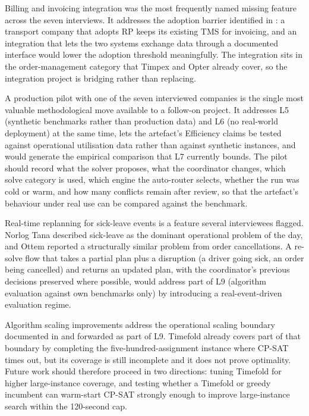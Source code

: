 Billing and invoicing integration was the most frequently named missing feature across the seven interviews. It addresses the adoption barrier identified in : a transport company that adopts RP keeps its existing TMS for invoicing, and an integration that lets the two systems exchange data through a documented interface would lower the adoption threshold meaningfully. The integration sits in the order-management category that Timpex and Opter already cover, so the integration project is bridging rather than replacing.

A production pilot with one of the seven interviewed companies is the single most valuable methodological move available to a follow-on project. It addresses L5 (synthetic benchmarks rather than production data) and L6 (no real-world deployment) at the same time, lets the artefact's Efficiency claims be tested against operational utilisation data rather than against synthetic instances, and would generate the empirical comparison that L7 currently bounds. The pilot should record what the solver proposes, what the coordinator changes, which solve category is used, which engine the auto-router selects, whether the run was cold or warm, and how many conflicts remain after review, so that the artefact's behaviour under real use can be compared against the benchmark.

Real-time replanning for sick-leave events is a feature several interviewees flagged. Norlog Tana described sick-leave as the dominant operational problem of the day, and Ottem reported a structurally similar problem from order cancellations. A re-solve flow that takes a partial plan plus a disruption (a driver going sick, an order being cancelled) and returns an updated plan, with the coordinator's previous decisions preserved where possible, would address part of L9 (algorithm evaluation against own benchmarks only) by introducing a real-event-driven evaluation regime.

Algorithm scaling improvements address the operational scaling boundary documented in  and forwarded as part of L9. Timefold already covers part of that boundary by completing the five-hundred-assignment instance where CP-SAT times out, but its coverage is still incomplete and it does not prove optimality. Future work should therefore proceed in two directions: tuning Timefold for higher large-instance coverage, and testing whether a Timefold or greedy incumbent can warm-start CP-SAT strongly enough to improve large-instance search within the 120-second cap.

